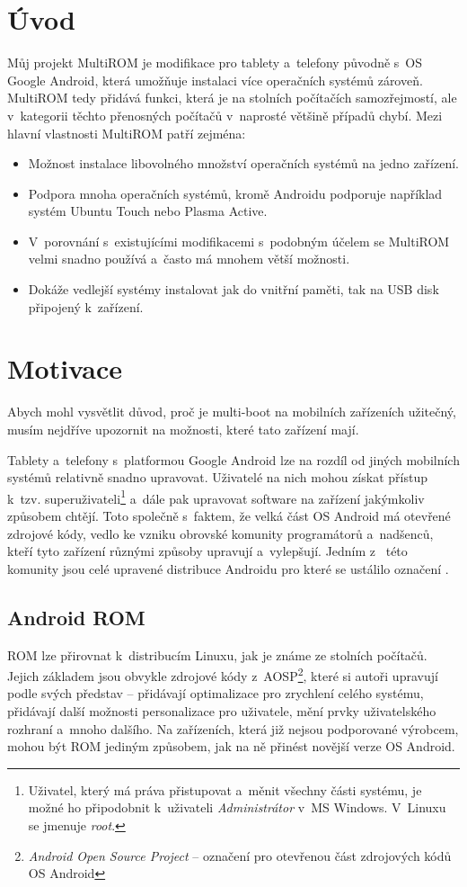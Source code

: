 \documentclass[12pt, a4paper, oneside]{article}
\newcommand{\It}{\textit}  %
\begin{document}
\section*{Úvod}
\label{uvod}
Můj projekt MultiROM je modifikace pro tablety a~telefony původně s~OS Google Android, která umožňuje instalaci více operačních systémů zároveň. MultiROM tedy přidává funkci, která je na stolních počítačích samozřejmostí, ale v~kategorii těchto přenosných počítačů v~naprosté většině případů chybí. Mezi hlavní vlastnosti MultiROM patří zejména:

\begin{itemize}
    \item Možnost instalace libovolného množství operačních systémů na jedno zařízení.
    \item Podpora mnoha operačních systémů, kromě Androidu podporuje například systém Ubuntu Touch nebo Plasma Active.
    \item V~porovnání s~existujícími modifikacemi s~podobným účelem se MultiROM velmi snadno používá a~často má mnohem větší možnosti.
    \item Dokáže vedlejší systémy instalovat jak do vnitřní paměti, tak na USB disk připojený k~zařízení.
\end{itemize}

\section{Motivace}
Abych mohl vysvětlit důvod, proč je multi-boot na mobilních zařízeních užitečný, musím nejdříve upozornit na možnosti, které tato zařízení mají.

Tablety a~telefony s~platformou Google Android lze na rozdíl od jiných mobilních systémů relativně snadno upravovat. Uživatelé na nich mohou získat přístup k~tzv. superuživateli\footnote{Uživatel, který má práva přistupovat a~měnit všechny části systému, je možné ho připodobnit k~uživateli \It{Administrátor} v~MS Windows. V~Linuxu se jmenuje \It{root}.} a~dále pak upravovat software na zařízení jakýmkoliv způsobem chtějí. Toto společně s~faktem, že velká část OS Android má otevřené zdrojové kódy, vedlo ke vzniku obrovské komunity programátorů a~nadšenců, kteří tyto zařízení různými způsoby upravují a~vylepšují. Jedním z~ této komunity jsou celé upravené distribuce Androidu pro které se ustálilo označení .

\subsection{Android ROM}
ROM lze přirovnat k~distribucím Linuxu, jak je známe ze stolních počítačů. Jejich základem jsou obvykle zdrojové kódy z~AOSP\cite{aosp}\footnote{\It{Android Open Source Project} -- označení pro otevřenou část zdrojových kódů OS Android}, které si autoři upravují podle svých představ -- přidávají optimalizace pro zrychlení celého systému, přidávají další možnosti personalizace pro uživatele, mění prvky uživatelského rozhraní a~mnoho dalšího. Na zařízeních, která již nejsou podporované výrobcem, mohou být ROM jediným způsobem, jak na ně přinést novější verze OS Android.
\end{document}
